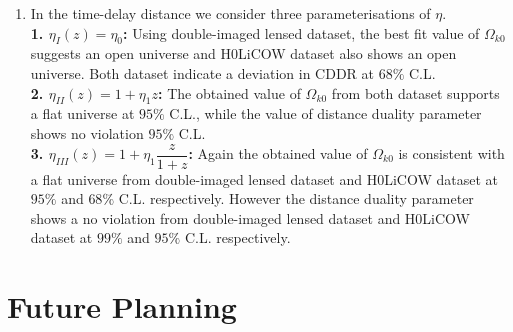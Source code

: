 \documentclass[12pt]{report}
\begin{document}
\begin{enumerate}
\item
In the time-delay distance we consider three parameterisations of $\eta$. \\
\textbf{1. $\eta_I(z)=\eta_0$:} Using double-imaged lensed dataset, the best fit value of $\Omega_{k0}$ suggests an open universe and H0LiCOW dataset also shows an open universe. Both dataset indicate a deviation in CDDR at $68\%$ C.L.\\
 \textbf{2. $\eta_{II}(z)=1+\eta_1z$:} The obtained value of  $\Omega_{k0}$ from both dataset supports a flat universe at $95\%$ C.L., while the value of distance duality parameter shows no violation $95\%$ C.L.\\
  \textbf{ 3. $\eta_{III}(z)=1+\eta_1\dfrac{z}{1+z}$:} Again the obtained value of $\Omega_{k0}$  is consistent with a flat universe from double-imaged lensed dataset and H0LiCOW dataset at $95\%$ and $68\%$ C.L. respectively. However the distance duality parameter shows a no violation from double-imaged lensed dataset and H0LiCOW dataset at $99\%$ and $95\%$ C.L. respectively.




\end{enumerate}
\chapter{Future Planning}
\end{document}
